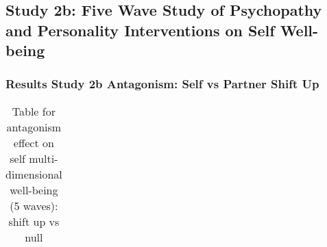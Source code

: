 \documentclass[
  singlecolumn]{article}
\begin{document}
\newpage{}

\subsection{Study 2b: Five Wave Study of Psychopathy and Personality
Interventions on Self
Well-being}\label{study-2b-five-wave-study-of-psychopathy-and-personality-interventions-on-self-well-being}

\subsubsection{Results Study 2b Antagonism: Self vs Partner Shift
Up}\label{results-study-2b-antagonism-self-vs-partner-shift-up}

\begin{longtable}[]{@{}
  >{\raggedright\arraybackslash}p{}
  >{\raggedleft\arraybackslash}p{}
  >{\raggedleft\arraybackslash}p{}
  >{\raggedleft\arraybackslash}p{}
  >{\raggedleft\arraybackslash}p{}
  >{\raggedleft\arraybackslash}p{}@{}}

\caption{\label{tbl-results-antagonism-self-up-long}Table for antagonism
effect on self multi-dimensional well-being (5 waves): shift up vs null}

\tabularnewline


\end{longtable}
\end{document}
